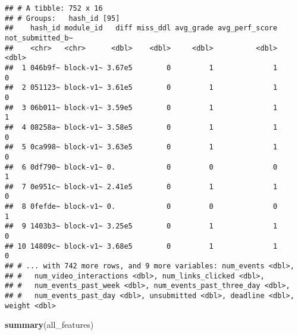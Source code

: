 \documentclass[
]{article}
\newenvironment{Shaded}{\begin{snugshade}}{\end{snugshade}}
\newcommand{\KeywordTok}[1]{\textcolor[rgb]{0.13,0.29,0.53}{\textbf{#1}}}
\newcommand{\NormalTok}[1]{#1}
\newcommand{\OperatorTok}[1]{\textcolor[rgb]{0.81,0.36,0.00}{\textbf{#1}}}
\newcommand{\StringTok}[1]{\textcolor[rgb]{0.31,0.60,0.02}{#1}}
\begin{document}
\begin{Shaded}
\end{Shaded}

\begin{verbatim}
## # A tibble: 752 x 16
## # Groups:   hash_id [95]
##    hash_id module_id   diff miss_ddl avg_grade avg_perf_score not_submitted_b~
##    <chr>   <chr>      <dbl>    <dbl>     <dbl>          <dbl>            <dbl>
##  1 046b9f~ block-v1~ 3.67e5        0         1              1                0
##  2 051123~ block-v1~ 3.61e5        0         1              1                0
##  3 06b011~ block-v1~ 3.59e5        0         1              1                1
##  4 08258a~ block-v1~ 3.58e5        0         1              1                0
##  5 0ca998~ block-v1~ 3.63e5        0         1              1                0
##  6 0df790~ block-v1~ 0.            0         0              0                1
##  7 0e951c~ block-v1~ 2.41e5        0         1              1                0
##  8 0fefde~ block-v1~ 0.            0         0              0                1
##  9 1403b3~ block-v1~ 3.25e5        0         1              1                0
## 10 14809c~ block-v1~ 3.68e5        0         1              1                0
## # ... with 742 more rows, and 9 more variables: num_events <dbl>,
## #   num_video_interactions <dbl>, num_links_clicked <dbl>,
## #   num_events_past_week <dbl>, num_events_past_three_day <dbl>,
## #   num_events_past_day <dbl>, unsubmitted <dbl>, deadline <dbl>, weight <dbl>
\end{verbatim}

\begin{Shaded}
\begin{Highlighting}[]
\KeywordTok{summary}\NormalTok{(all_features)}
\end{Highlighting}
\end{Shaded}
\end{document}
